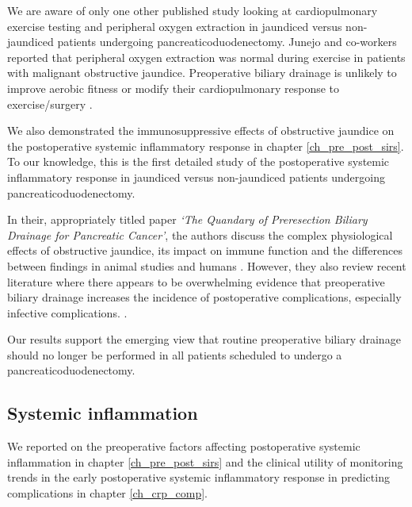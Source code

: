 We are aware of only one other published study looking at cardiopulmonary exercise testing and peripheral oxygen extraction in jaundiced versus non-jaundiced patients undergoing pancreaticoduodenectomy. 
Junejo and co-workers reported that peripheral oxygen extraction was normal during exercise in patients with malignant obstructive jaundice.\parencite{junejo_peripheral_2014} 
Preoperative biliary drainage is unlikely to improve aerobic fitness or modify their cardiopulmonary response to exercise/surgery \parencite{parker_serum_2014}.

We also demonstrated the immunosuppressive effects of obstructive jaundice on the postoperative systemic inflammatory response in chapter \ref{ch_pre_post_sirs}. 
To our knowledge, this is the first detailed study of the postoperative systemic inflammatory response in jaundiced versus non-jaundiced patients undergoing pancreaticoduodenectomy.

In their, appropriately titled paper \textit{`The Quandary of Preresection Biliary Drainage for Pancreatic Cancer'}, the authors discuss the complex physiological effects of obstructive jaundice, its impact on immune function and the differences between findings in animal studies and humans \parencite{tol_quandary_2012}.
However, they also review recent literature where there appears to be overwhelming evidence that preoperative biliary drainage increases the incidence of postoperative complications, especially infective complications. \parencite{van_der_gaag_preoperative_2010, arkadopoulos_preoperative_2014, fujii_preoperative_2015, furukawa_negative_2015}.


Our results support the emerging view that routine preoperative biliary drainage should no longer be performed in all patients scheduled to undergo a pancreaticoduodenectomy.

\subsection{Systemic inflammation}
We reported on the preoperative factors affecting postoperative systemic inflammation in chapter \ref{ch_pre_post_sirs} and the clinical utility of monitoring trends in the early postoperative systemic inflammatory response in predicting complications in chapter \ref{ch_crp_comp}.

